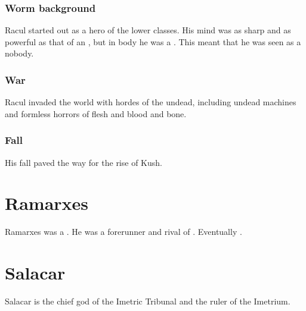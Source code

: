 \subsubsection{Worm background}
Racul started out as a hero of the lower classes. 
His mind was as sharp and as powerful as that of an , but in body he was a .
This meant that he was seen as a nobody. 





\subsubsection{War}
Racul invaded the world with hordes of the undead, including undead machines and formless horrors of flesh and blood and bone. 





\subsubsection{Fall}
His fall paved the way for the rise of Kush.















\section{Ramarxes}
Ramarxes was a \caisith.
He was a forerunner and rival of . 
Eventually . 















\section{Salacar}
Salacar is the chief god of the Imetric Tribunal and the ruler of the Imetrium. 









